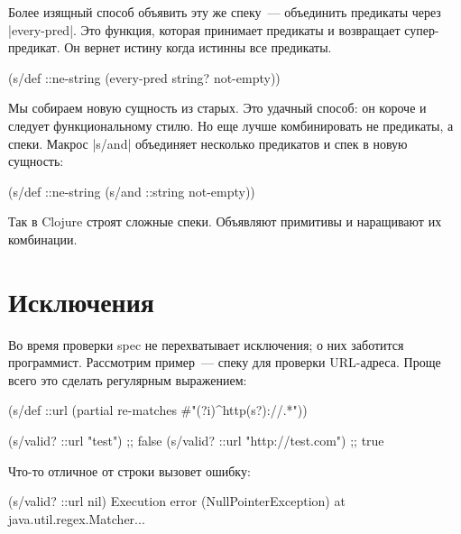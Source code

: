 Более изящный способ объявить эту же спеку~--- объединить предикаты через
\spverb|every-pred|. Это функция, которая принимает предикаты и возвращает
супер-предикат. Он вернет истину когда истинны все предикаты.

\begin{english}
  \begin{clojure}
(s/def ::ne-string
  (every-pred string? not-empty))
  \end{clojure}
\end{english}

Мы собираем новую сущность из старых. Это удачный способ: он короче и следует
функциональному стилю. Но еще лучше комбинировать не предикаты, а спеки. Макрос
\spverb|s/and| объединяет несколько предикатов и спек в новую сущность:

\begin{english}
  \begin{clojure}
(s/def ::ne-string
  (s/and ::string not-empty))
  \end{clojure}
\end{english}

Так в Clojure строят сложные спеки. Объявляют примитивы и наращивают их
комбинации.

\section{Исключения}

Во время проверки spec не перехватывает исключения; о них заботится
программист. Рассмотрим пример~--- спеку для проверки URL-адреса. Проще всего
это сделать регулярным выражением:

\begin{english}
  \begin{clojure}
(s/def ::url
  (partial re-matches #"(?i)^http(s?)://.*"))

(s/valid? ::url "test")            ;; false
(s/valid? ::url "http://test.com") ;; true
  \end{clojure}
\end{english}

\noindent
Что-то отличное от строки вызовет ошибку:

\begin{english}
  \begin{clojure}
(s/valid? ::url nil)
Execution error (NullPointerException) at java.util.regex.Matcher...
  \end{clojure}
\end{english}

